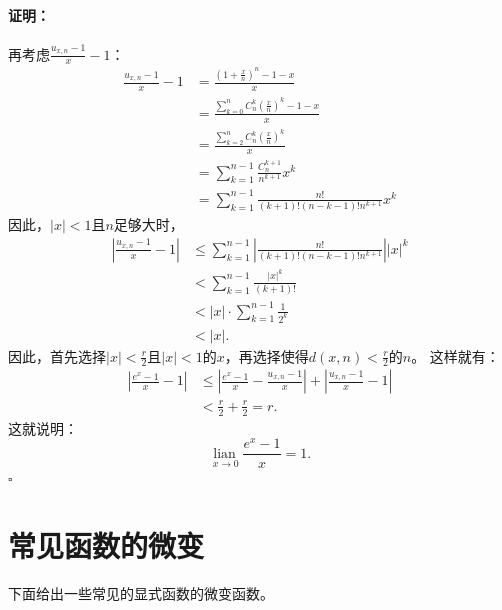\documentclass[12pt,UTF8]{ctexbook}
\newcommand{\lian}[1]{
    \underset{#1}{\operatorname{lian}\,}
}
\renewenvironment{proof}{\paragraph{\textbf{证明：}}}{\hfill$\square$}
\begin{document}
\begin{appendix}
\begin{proof}
    再考虑$\frac{u_{x,n} - 1}{x} - 1$：
    \begin{align*}
        \frac{u_{x,n} - 1}{x} - 1 &= \frac{\left(1 + \frac{x}{n}\right)^{n} - 1 - x}{x}  \\
        &= \frac{\sum_{k=0}^n C_n^k \left(\frac{x}{n}\right)^k - 1 - x}{x}  \\
        &= \frac{\sum_{k=2}^n C_n^k \left(\frac{x}{n}\right)^k}{x}  \\
        &= \sum_{k=1}^{n-1} \frac{C_n^{k+1}}{n^{k+1}} x^k  \\
        &= \sum_{k=1}^{n-1} \frac{n!}{(k+1)!(n-k-1)!n^{k+1}} x^k  
    \end{align*}
    因此，$|x|<1$且$n$足够大时，
    \begin{align*}
        \left| \frac{u_{x,n} - 1}{x} - 1 \right| &\leqslant \sum_{k=1}^{n-1} \left|\frac{n!}{(k+1)!(n-k-1)!n^{k+1}}\right| |x|^k  \\
        &< \sum_{k=1}^{n-1} \frac{|x|^k}{(k+1)!}  \\
        &< |x| \cdot \sum_{k=1}^{n-1} \frac{1}{2^k}  \\
        &< |x|.  
    \end{align*}
    因此，首先选择$|x| < \frac{r}{2}$且$|x|<1$的$x$，再选择使得$d(x, n) < \frac{r}{2}$的$n$。
    这样就有：
    \begin{align*}
        \left|\frac{e^x - 1}{x} - 1\right| &\leqslant \left|\frac{e^x - 1}{x} - \frac{u_{x,n} - 1}{x}\right| + \left|\frac{u_{x,n} - 1}{x} - 1\right|  \\
        &< \frac{r}{2} + \frac{r}{2} = r.   
    \end{align*}
    这就说明：
    $$\lian{x\to 0} \frac{e^x - 1}{x} = 1.$$
\end{proof}

\section{常见函数的微变}

下面给出一些常见的显式函数的微变函数。


\end{appendix}
\end{document}
